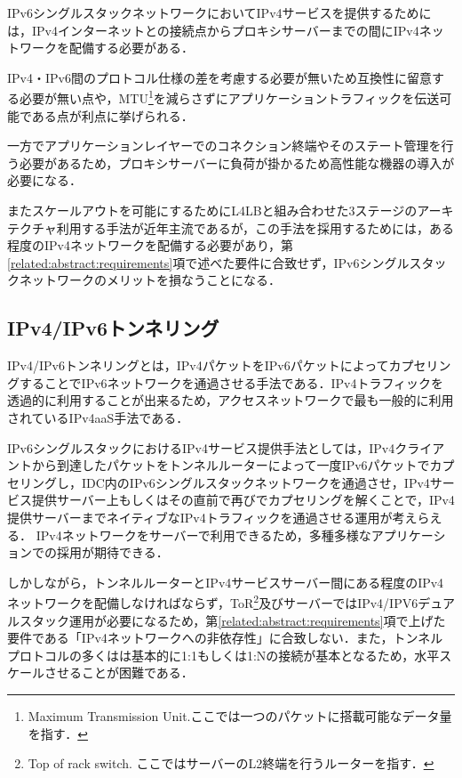 IPv6シングルスタックネットワークにおいてIPv4サービスを提供するためには，IPv4インターネットとの接続点からプロキシサーバーまでの間にIPv4ネットワークを配備する必要がある．

IPv4・IPv6間のプロトコル仕様の差を考慮する必要が無いため互換性に留意する必要が無い点や，MTU\footnote{Maximum Transmission Unit.ここでは一つのパケットに搭載可能なデータ量を指す．}を減らさずにアプリケーショントラフィックを伝送可能である点が利点に挙げられる．

一方でアプリケーションレイヤーでのコネクション終端やそのステート管理を行う必要があるため，プロキシサーバーに負荷が掛かるため高性能な機器の導入が必要になる．

またスケールアウトを可能にするためにL4LBと組み合わせた3ステージのアーキテクチャ利用する手法が近年主流である\cite{Facebook_LB, Google_LB}が，この手法を採用するためには，ある程度のIPv4ネットワークを配備する必要があり，第\ref{related:abstract:requirements}項で述べた要件に合致せず，IPv6シングルスタックネットワークのメリットを損なうことになる．



\subsection{IPv4/IPv6トンネリング}

IPv4/IPv6トンネリングとは，IPv4パケットをIPv6パケットによってカプセリングすることでIPv6ネットワークを通過させる手法である．IPv4トラフィックを透過的に利用することが出来るため，アクセスネットワークで最も一般的に利用されているIPv4aaS手法である．


IPv6シングルスタックにおけるIPv4サービス提供手法としては，IPv4クライアントから到達したパケットをトンネルルーターによって一度IPv6パケットでカプセリングし，IDC内のIPv6シングルスタックネットワークを通過させ，IPv4サービス提供サーバー上もしくはその直前で再びでカプセリングを解くことで，IPv4提供サーバーまでネイティブなIPv4トラフィックを通過させる運用が考えらえる．
IPv4ネットワークをサーバーで利用できるため，多種多様なアプリケーションでの採用が期待できる．

しかしながら，トンネルルーターとIPv4サービスサーバー間にある程度のIPv4ネットワークを配備しなければならず，ToR\footnote{Top of rack switch. ここではサーバーのL2終端を行うルーターを指す．}及びサーバーではIPv4/IPV6デュアルスタック運用が必要になるため，第\ref{related:abstract:requirements}項で上げた要件である「IPv4ネットワークへの非依存性」に合致しない．また，トンネルプロトコルの多く\cite{6799698}はは基本的に1:1もしくは1:Nの接続が基本となるため，水平スケールさせることが困難である．


